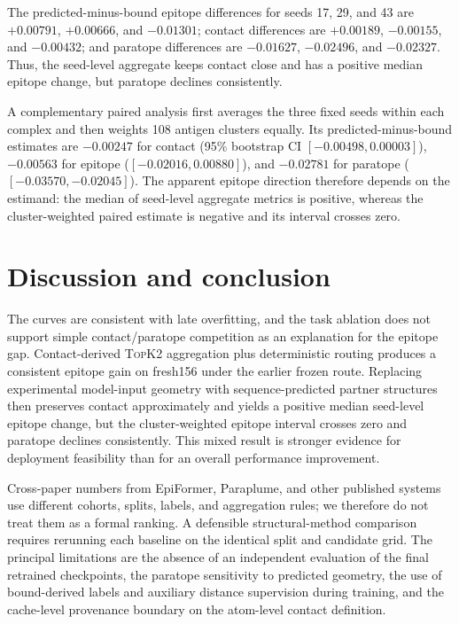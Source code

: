 \documentclass[10pt]{article}
\newcommand{\topktwo}{\textsc{TopK2}}
\begin{document}
The predicted-minus-bound epitope differences for seeds 17, 29, and 43 are
$+0.00791$, $+0.00666$, and $-0.01301$; contact differences are $+0.00189$,
$-0.00155$, and $-0.00432$; and paratope differences are $-0.01627$,
$-0.02496$, and $-0.02327$. Thus, the seed-level aggregate keeps contact close
and has a positive median epitope change, but paratope declines consistently.

A complementary paired analysis first averages the three fixed seeds within
each complex and then weights 108 antigen clusters equally. Its
predicted-minus-bound estimates are $-0.00247$ for contact (95\% bootstrap CI
$[-0.00498,0.00003]$), $-0.00563$ for epitope
($[-0.02016,0.00880]$), and $-0.02781$ for paratope
($[-0.03570,-0.02045]$). The apparent epitope direction therefore depends on
the estimand: the median of seed-level aggregate metrics is positive, whereas
the cluster-weighted paired estimate is negative and its interval crosses zero.

\section{Discussion and conclusion}

The curves are consistent with late overfitting, and the task ablation does not
support simple contact/paratope competition as an explanation for the epitope
gap. Contact-derived \topktwo{} aggregation plus deterministic routing produces
a consistent epitope gain on fresh156 under the earlier frozen route. Replacing
experimental model-input geometry with sequence-predicted partner structures
then preserves contact approximately and yields a positive median seed-level
epitope change, but the cluster-weighted epitope interval crosses zero and
paratope declines consistently. This mixed result is stronger evidence for
deployment feasibility than for an overall performance improvement.

Cross-paper numbers from EpiFormer, Paraplume, and other published systems use
different cohorts, splits, labels, and aggregation rules; we therefore do not
treat them as a formal ranking. A defensible structural-method comparison
requires rerunning each baseline on the identical split and candidate grid.
The principal limitations are the absence of an independent evaluation of the
final retrained checkpoints, the paratope sensitivity to predicted geometry,
the use of bound-derived labels and auxiliary distance supervision during
training, and the cache-level provenance boundary on the atom-level contact
definition.
\end{document}
